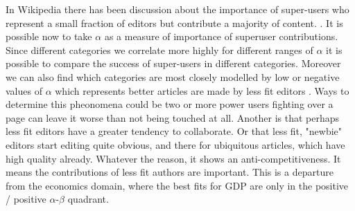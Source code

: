 \documentclass{acm_proc_article-sp}
\begin{document}
In Wikipedia there has been discussion about the importance of super-users who represent a small fraction of editors but contribute a majority of content. \cite{website:wikinewsreporter}. It is possible now to take $\alpha$ as a measure of importance of superuser contributions. Since different categories we correlate more highly for different ranges of $\alpha$ it is possible to compare the success of super-users in different categories. Moreover we can also find which categories are most closely modelled by low or negative values of $\alpha$ which represents better articles are made by less fit editors . Ways to determine this pheonomena could be two or more power users fighting over a page can leave it worse than not being touched at all. Another is that perhaps less fit editors have a greater tendency to collaborate. Or that less fit, "newbie" editors start editing quite obvious, and there for ubiquitous articles, which have high quality already.  Whatever the reason,  it shows an anti-competitiveness. It means the contributions of less fit authors are important. This is a departure from the economics domain, where the best fits for GDP are only in the positive / positive $\alpha$-$\beta$ quadrant. 




  

%
%
\end{document}
